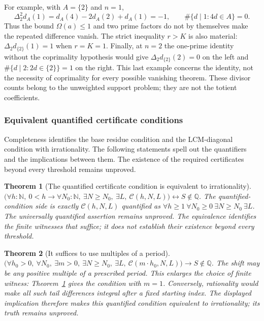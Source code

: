 \documentclass[11pt]{article}
\theoremstyle{plain}
\newtheorem{thm}{Theorem}[section]
\theoremstyle{definition}
\theoremstyle{remark}
\begin{document}
For example, with $A=\{2\}$ and $n=1$,
\[
 \Delta_2^2d_A(1)=d_A(4)-2d_A(2)+d_A(1)=-1,
 \qquad \#\{d\mid1:4d\in A\}=0.
\]
Thus the bound $\Omega(a)\le1$ and two prime factors do not by themselves
make the repeated difference vanish. The strict inequality $r>K$ is
also material: $\Delta_2d_{\{2\}}(1)=1$ when $r=K=1$.
Finally, at $n=2$ the one-prime identity without the coprimality hypothesis
would give $\Delta_2d_{\{2\}}(2)=0$ on the left and
$\#\{d\mid2:2d\in\{2\}\}=1$ on the right.
This last example concerns the identity, not the necessity of coprimality
for every possible vanishing theorem. These divisor counts belong to
the unweighted support problem; they are not the totient coefficients.

\subsubsection{Equivalent quantified certificate conditions}

Completeness identifies the base residue condition and the LCM-diagonal
condition with irrationality. The following statements spell out the
quantifiers and the implications between them. The existence of the
required certificates beyond every threshold remains unproved.

\begin{thm}[The quantified certificate condition is equivalent to irrationality]\label{catalogue:cert:a10}
$\big(\forall h:\mathbb{N},\ 0<h \to \forall N_0:\mathbb{N},\ \exists N\ge N_0,\ \exists L,\ \mathcal{C}(h,N,L)\big) \leftrightarrow S\notin\mathbb Q$. The quantified-condition side is exactly $\mathcal{C}(h,N,L)$ quantified as $\forall h\ge1\ \forall N_0\ge0\ \exists N\ge N_0\ \exists L$. The universally quantified assertion remains unproved. The equivalence identifies the finite witnesses that suffice; it does not establish their existence beyond every threshold.
\end{thm}

\begin{thm}[It suffices to use multiples of a period]\label{catalogue:cert:b2}
$\big(\forall h_0>0,\ \forall N_0,\ \exists m>0,\ \exists N\ge N_0,\ \exists L,\ \mathcal{C}(m\cdot h_0, N, L)\big) \to S\notin\mathbb Q$. The shift may be any positive multiple of a prescribed period. This
enlarges the choice of finite witness: Theorem~\ref{catalogue:cert:a10}
gives the condition with $m=1$. Conversely, rationality would make all
such tail differences integral after a fixed starting index. The
displayed implication therefore makes this quantified condition
equivalent to irrationality; its truth remains unproved.
\end{thm}
\end{document}
